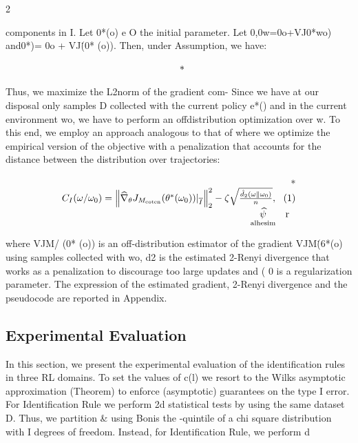 \documentclass{article}
\begin{document}
\sloppy

\begin{paracol}{2}
\RaggedRight

components in I. Let 0*(o) e O the initial parameter.
Let 0,0w=0o+VJ0*wo) and0*)=
0o + VJ\. (0* (o)). Then, under Assumption, we have:


\begin{equation}
\begin{array} { r l } & { * ~ }\end{array}
\end{equation}


Thus, we maximize the L2norm of the gradient com-
Since we have at our disposal only samples D collected with
the current policy e*() and in the current environment wo,
we have to perform an offdistribution optimization over w.
To this end, we employ an approach analogous to that of
where we optimize the empirical version of the objective
with a penalization that accounts for the distance between
the distribution over trajectories:


\begin{equation}
\begin{array} { r } { * } \\ { C _ { I } ( \omega / \omega _ { 0 } ) = \left \| \widehat { \nabla } _ { \theta } J _ { M _ { \mathrm { c o t e n } } } ( \theta ^ { * } ( \omega _ { 0 } ) ) | _ { \overline { I } } \right \| _ { 2 } ^ { 2 } - \zeta \sqrt { \frac { \hat { d } _ { 2 } ( \omega \| \omega _ { 0 } ) } { n } }, ~ ~ ( 1 ) } \\ { \underset { \mathrm { a l h e s i m } } { \widehat { \psi } } \mathrm { ~ \textit ~ { ~ r ~ } ~}}\end{array}
\end{equation}


where VJM/ (0* (o)) is an off-distribution estimator of
the gradient VJM\. (6*(o) using samples collected with
wo, d2 is the estimated 2-Renyi divergence that works as
a penalization to discourage too large updates and (  0
is a regularization parameter. The expression of the estimated gradient, 2-Renyi divergence and the pseudocode are
reported in Appendix.


\subsection*{Experimental Evaluation}


In this section, we present the experimental evaluation of the
identification rules in three RL domains. To set the values of
c(l) we resort to the Wilks asymptotic approximation (Theorem) to enforce (asymptotic) guarantees on the type I error. For Identification Rule we perform 2d statistical tests by
using the same dataset D. Thus, we partition \& using Bonis the -quintile of a chi square distribution with I degrees
of freedom. Instead, for Identification Rule, we perform d



\end{paracol}
\end{document}
